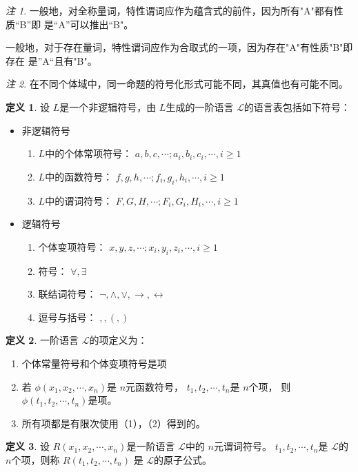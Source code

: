 \documentclass[a4paper,11pt]{article}%
\theoremstyle{remark}
\newtheorem*{remark}{注}
\theoremstyle{remark}
\theoremstyle{definition}
\theoremstyle{definition}
\newtheorem*{definition}{定义}
\theoremstyle{plain}
\begin{document}
\begin{remark}
    一般地，对全称量词，特性谓词应作为蕴含式的前件，因为所有"A"都有性质“B”即
    是“A”可以推出“B"。

    一般地，对于存在量词，特性谓词应作为合取式的一项，因为存在"A"有性质"B"即存在
    是”A“且有"B"。
\end{remark}
\begin{remark}
    在不同个体域中，同一命题的符号化形式可能不同，其真值也有可能不同。
\end{remark}
\begin{definition}
    设 $L$是一个非逻辑符号，由 $L$生成的一阶语言 $\mathcal{L}$的语言表包括如下符号：
\begin{itemize}
    \item 非逻辑符号
    \begin{enumerate}
        \item $L$中的个体常项符号： $a,b,c,\cdots;a_i,b_i,c_i,\cdots,i\geq 1$
        \item $L$中的函数符号： $f,g,h,\cdots;f_i,g_i,h_i,\cdots,i\geq 1$
        \item $L$中的谓词符号： $F,G,H,\cdots;F_i,G_i,H_i,\cdots,i\geq 1$
    \end{enumerate}
    \item 逻辑符号
    \begin{enumerate}
        \item 个体变项符号： $x,y,z,\cdots;x_i,y_i,z_i,\cdots,i\geq 1$
        \item 符号： $\forall,\exists$
        \item 联结词符号： $\lnot,\land,\lor,\rightarrow,\leftrightarrow$
        \item 逗号与括号： $,,(,)$
    \end{enumerate}
\end{itemize}
\end{definition}
\begin{definition}
    一阶语言 $\mathcal{L}$的项定义为：
    \begin{enumerate}
        \item 个体常量符号和个体变项符号是项
        \item 若 $\phi(x_1,x_2,\cdots,x_n)$是 $n$元函数符号， $t_1,t_2,\cdots,t_n$是 $n$个项， 
        则 $\phi(t_1,t_2,\cdots,t_n)$是项。
        \item 所有项都是有限次使用（1），（2）得到的。
    \end{enumerate}
\end{definition}
\begin{definition}
    设 $R(x_1,x_2,\cdots,x_n)$是一阶语言 $\mathcal{L}$中的 $n$元谓词符号。
    $t_1,t_2,\cdots,t_n$是 $\mathcal{L}$的 $n$个项，则称 $R(t_1,t_2,\cdots,t_n)$
    是 $\mathcal{L}$的原子公式。
\end{definition}
\end{document}
